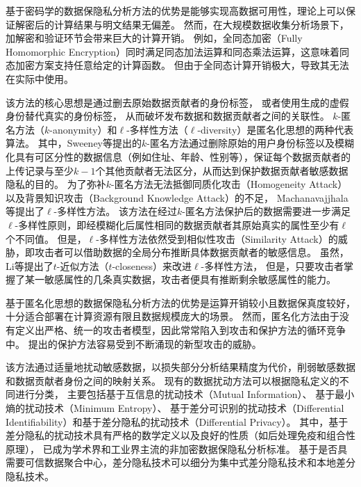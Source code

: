 基于密码学的数据保隐私分析方法的优势是能够实现高数据可用性，理论上可以保证解密后的计算结果与明文结果无偏差。
然而，在大规模数据收集分析场景下，加解密和验证环节会带来巨大的计算开销。
例如，全同态加密（Fully Homomorphic Encryption）\cite{DBLP:conf/stoc/Gentry09}同时满足同态加法运算和同态乘法运算，这意味着同态加密方案支持任意给定的计算函数。
但由于全同态计算开销极大，导致其无法在实际中使用。

该方法的核心思想是通过删去原始数据贡献者的身份标签，
或者使用生成的虚假身份替代真实的身份标签，
从而破坏发布数据和数据贡献者之间的关联性\cite{DBLP:conf/icde/LiLZ09}。
$k$-匿名方法（$k$-anonymity）和$\ell$-多样性方法（$\ell$-diversity）是匿名化思想的两种代表算法。
其中，Sweeney等\cite{DBLP:journals/ijufks/Sweene02}提出的$k$-匿名方法通过删除原始的用户身份标签以及模糊化具有可区分性的数据信息（例如住址、年龄、性别等），保证每个数据贡献者的上传记录与至少$k-1$个其他贡献者无法区分，从而达到保护数据贡献者敏感数据隐私的目的。
为了弥补$k$-匿名方法无法抵御同质化攻击（Homogeneity Attack）以及背景知识攻击（Background Knowledge Attack）的不足，
Machanavajjhala等\cite{DBLP:conf/icde/MachanavajjhalaGKV06}提出了$\ell$-多样性方法。
该方法在经过$k$-匿名方法保护后的数据需要进一步满足$\ell$-多样性原则，即经模糊化后属性相同的数据贡献者其原始真实的属性至少有$\ell$个不同值。
但是，$\ell$-多样性方法依然受到相似性攻击（Similarity Attack）的威胁，即攻击者可以借助数据的全局分布推断具体数据贡献者的敏感信息。
虽然，Li等\cite{DBLP:conf/icde/LiLV07}提出了$t$-近似方法（$t$-closeness）来改进$\ell$-多样性方法，
但是，只要攻击者掌握了某一敏感属性的几条真实数据，攻击者便具有推断剩余敏感属性的能力\cite{DBLP:journals/kbs/Domingo-FerrerS15}。

基于匿名化思想的数据保隐私分析方法的优势是运算开销较小且数据保真度较好，
十分适合部署在计算资源有限且数据规模庞大的场景。
然而，匿名化方法由于没有定义出严格、统一的攻击者模型，因此常常陷入到攻击和保护方法的循环竞争中。
提出的保护方法容易受到不断涌现的新型攻击的威胁。

该方法通过适量地扰动敏感数据，以损失部分分析结果精度为代价，削弱敏感数据和数据贡献者身份之间的映射关系。
现有的数据扰动方法可以根据隐私定义的不同进行分类，
主要包括基于互信息的扰动技术（Mutual Information）\cite{cuff2016differential}、
基于最小熵的扰动技术（Minimum Entropy）\cite{alvim2011differential}、
基于差分可识别的扰动技术（Differential Identifiability）\cite{lee2012differential}和基于差分隐私的扰动技术（Differential Privacy）\cite{dwork2008differential}。
其中，基于差分隐私的扰动技术具有严格的数学定义以及良好的性质（如后处理免疫和组合性原理），
已成为学术界和工业界主流的非加密数据保隐私分析标准\cite{wang2016relation}。
基于是否具需要可信数据聚合中心，差分隐私技术可以细分为集中式差分隐私技术和本地差分隐私技术。

